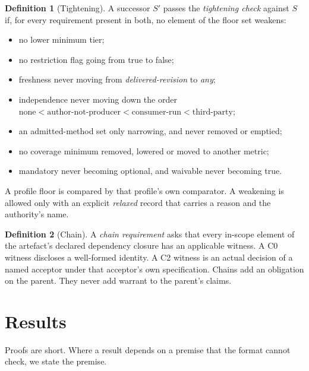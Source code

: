 \documentclass[11pt]{article}
\theoremstyle{definition}
\newtheorem{definition}{Definition}
\theoremstyle{remark}
\begin{document}
\begin{definition}[Tightening]\label{def:tight}
A successor $S'$ passes the \emph{tightening check} against $S$ if, for every requirement present
in both, no element of the floor set weakens:
\begin{itemize}[itemsep=1pt]
\item no lower minimum tier;
\item no restriction flag going from true to false;
\item freshness never moving from \emph{delivered-revision} to \emph{any};
\item independence never moving down the order
  $\text{none}<\text{author-not-producer}<\text{consumer-run}<\text{third-party}$;
\item an admitted-method set only narrowing, and never removed or emptied;
\item no coverage minimum removed, lowered or moved to another metric;
\item mandatory never becoming optional, and waivable never becoming true.
\end{itemize}
A profile floor is compared by that profile's own comparator. A weakening is allowed only with an
explicit \emph{relaxed} record that carries a reason and the authority's name.
\end{definition}

\begin{definition}[Chain]\label{def:chain}
A \emph{chain requirement} asks that every in-scope element of the artefact's declared dependency
closure has an applicable witness. A C0 witness discloses a well-formed identity. A C2 witness is
an actual decision of a named acceptor under that acceptor's own specification. Chains add an
obligation on the parent. They never add warrant to the parent's claims.
\end{definition}

\section{Results}\label{sec:results}

Proofs are short. Where a result depends on a premise that the format cannot check, we state the
premise.
\end{document}
